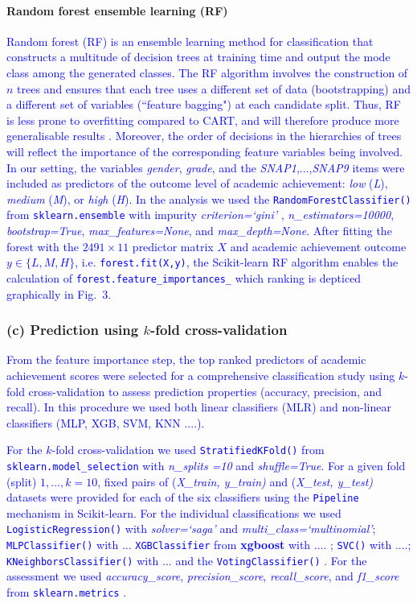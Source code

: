 \documentclass[10pt,letterpaper]{article}
\begin{document}
{{\paragraph{Random forest ensemble learning (RF)}
\textcolor{blue}{Random forest (RF) is an ensemble learning method for classification that constructs a multitude of decision trees at training time and output the mode class among 
the generated classes. The RF algorithm involves the construction of $n$ trees and ensures that each tree uses a different set of data (bootstrapping) 
and a different set of variables (``feature bagging") at each candidate split. 
Thus, RF is less prone to overfitting compared to CART, and will therefore produce more generalisable results \cite{Breiman2001}.  
Moreover, the order of decisions in the hierarchies of trees will reflect the importance of the corresponding feature variables being involved. In our setting,
the variables {\it gender}, {\it grade}, and the {\it SNAP1},$\ldots$,{\it SNAP9} items were included as predictors of the outcome level of academic achievement:
{\it low} ({\it L}), {\it medium} ({\it M}), or {\it high} ({\it H}).
In the analysis we used the {\tt \small RandomForestClassifier()}  from {\tt \small sklearn.ensemble} with impurity {\it criterion=`gini'} ,
{\it n\_estimators=10000}, {\it bootstrap=True}, {\it max\_features=None}, and {\it max\_depth=None}. 
After fitting the forest with the $2491 \times 11$ predictor matrix $X$ and academic achievement outcome $y \in \{L, M, H\} $, i.e. {\tt \small forest.fit(X,y)}, the 
Scikit-learn RF algorithm enables the calculation of {\tt \small forest.feature\_importances\_} which ranking is depticed graphically in Fig.~3.}



\subsubsection*{(c) Prediction using $k$-fold cross-validation}

\textcolor{blue}{From the feature importance step, the top ranked predictors of academic achievement scores were 
selected for a comprehensive classification study using $k$-fold cross-validation to assess prediction properties (accuracy, precision, and recall). 
In this procedure we used both linear classifiers (MLR) and non-linear classifiers (MLP, XGB, SVM, KNN ....). }

\textcolor{blue}{For the $k$-fold cross-validation we used  {\tt StratifiedKFold()}  from {\tt sklearn.model\_selection}  with {\it n\_splits =10} and {\it shuffle=True}. 
For a given fold (split) $1,\ldots,k=10$, fixed pairs of ({\it X\_train, y\_train)} and ({\it X\_test, y\_test)} datasets were provided for each of the six classifiers 
using the {\tt Pipeline} mechanism in Scikit-learn. 
For the individual classifications we used {\tt LogisticRegression()} with {\it solver=`saga'} and {\it multi\_class=`multinomial'}; 
{\tt MLPClassifier()} with ...  {\tt XGBClassifier} from {\bf xgboost} with .... ;  {\tt SVC()} with ....;  {\tt KNeighborsClassifier()} with ...
and the {\tt VotingClassifier()} .
For the assessment we used {\it accuracy\_score}, {\it precision\_score}, {\it recall\_score}, and {\it f1\_score} from {\tt sklearn.metrics} .}


}}
\end{document}
